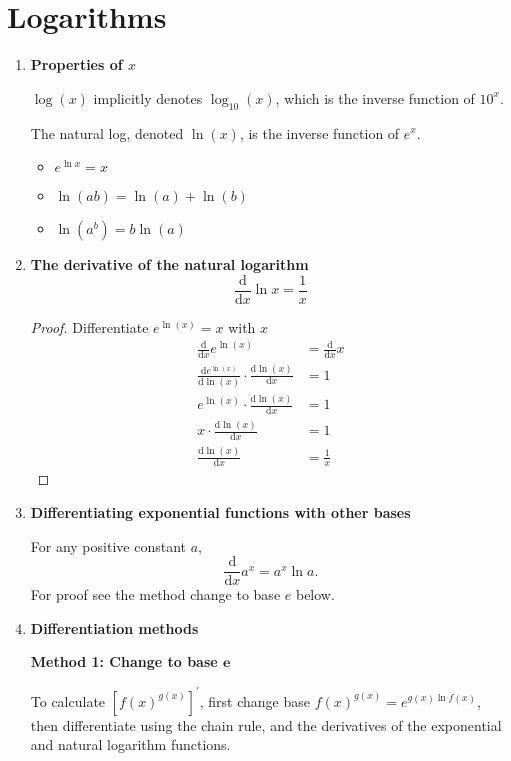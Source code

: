 \section{Logarithms}
\begin{enumerate}
    \item \textbf{Properties of $x$}

        $\log(x)$ implicitly denotes $\log_{10}(x)$, which is the inverse function of $10^x$.

        The natural log, denoted $\ln(x)$, is the inverse function of $e^x$.
        \begin{itemize}
            \item $e^{\ln x}=x$
            \item $\ln(ab)=\ln(a)+\ln(b)$
            \item $\ln(a^b)=b\ln(a)$
        \end{itemize}
    \item \textbf{The derivative of the natural logarithm}
        $$
        \frac{\mathrm{d}}{\mathrm{d}x}\ln x=\frac{1}{x}
        $$
        \begin{proof}
            Differentiate $e^{\ln(x)}=x$ with $x$
            \begin{align*}
                \frac{\mathrm{d}}{\mathrm{d}x}e^{\ln(x)} & =\frac{\mathrm{d}}{\mathrm{d}x}x \\
                \frac{\mathrm{d}e^{\ln(x)}}{\mathrm{d}\ln(x)}\cdot\frac{\mathrm{d}\ln(x)}{\mathrm{d}x} & =1 \\
                e^{\ln(x)}\cdot\frac{\mathrm{d}\ln(x)}{\mathrm{d}x} & =1 \\
                x\cdot\frac{\mathrm{d}\ln(x)}{\mathrm{d}x} & =1 \\
                \frac{\mathrm{d}\ln(x)}{\mathrm{d}x} & =\frac{1}{x}
            \end{align*}
        \end{proof}
    \item \textbf{Differentiating exponential functions with other bases}

        For any positive constant $a$,
        $$
        \frac{\mathrm{d}}{\mathrm{d}x}a^x=a^x\ln a.
        $$
        For proof see the method change to base $e$ below.
    \item \textbf{Differentiation methods}
        
        \textbf{Method 1: Change to base $\bm{e}$}

        To calculate $\left[f(x)^{g(x)}\right]^\prime$, first change base $f(x)^{g(x)}=e^{g(x)\ln f(x)}$, then differentiate using the chain rule, and the derivatives of the exponential and natural logarithm functions.
\end{enumerate}
